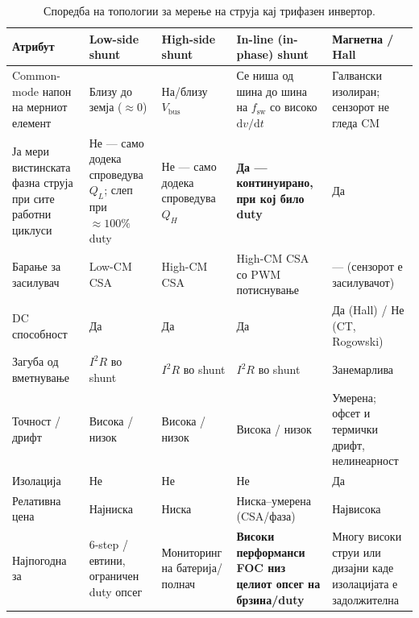 \documentclass[journal,onecolumn,11pt]{IEEEtran}
\newcommand{\Vdcbus}{V_{\mathrm{bus}}}
\newcommand{\Fswsw}{f_{\mathrm{sw}}}
\begin{document}
\begin{table}[t]
\centering
\caption{Споредба на топологии за мерење на струја кај трифазен инвертор.}
\label{tab:topo}
\small
\renewcommand{\arraystretch}{1.25}
\begin{tabular}{p{2.6cm} p{2.4cm} p{2.6cm} p{3.0cm} p{3.4cm}}
\toprule
\textbf{Атрибут} & \textbf{Low-side shunt} & \textbf{High-side shunt} & \textbf{In-line (in-phase) shunt} & \textbf{Магнетна / Hall} \\
\midrule
Common-mode напон на мерниот елемент & Близу до земја ($\approx\!0$) & На/близу $\Vdcbus$ & Се ниша од шина до шина на $\Fswsw$ со високо $\mathrm{d}v/\mathrm{d}t$ & Галвански изолиран; сензорот не гледа CM \\
Ја мери вистинската фазна струја при сите работни циклуси & Не --- само додека спроведува $Q_L$; слеп при $\approx100\%$ duty & Не --- само додека спроведува $Q_H$ & \textbf{Да --- континуирано, при кој било duty} & Да \\
Барање за засилувач & Low-CM CSA & High-CM CSA & High-CM CSA со PWM потиснување & --- (сензорот е засилувачот)\\
DC способност & Да & Да & Да & Да (Hall) / Не (CT, Rogowski)\\
Загуба од вметнување & $I^2R$ во shunt & $I^2R$ во shunt & $I^2R$ во shunt & Занемарлива\\
Точност / дрифт & Висока / низок & Висока / низок & Висока / низок & Умерена; офсет и термички дрифт, нелинеарност\\
Изолација & Не & Не & Не & Да\\
Релативна цена & Најниска & Ниска & Ниска--умерена (CSA/фаза) & Највисока\\
Најпогодна за & 6-step / евтини, ограничен duty опсег & Мониторинг на батерија/полнач & \textbf{Високи перформанси FOC низ целиот опсег на брзина/duty} & Многу високи струи или дизајни каде изолацијата е задолжителна\\
\bottomrule
\end{tabular}
\end{table}
\end{document}
